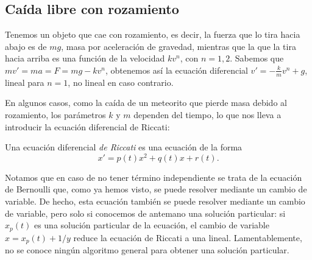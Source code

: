 \documentclass[../ecuaciones_diferenciales.tex]{subfiles}
\begin{document}
\subsection{Caída libre con rozamiento}
Tenemos un objeto que cae con rozamiento, es decir, la fuerza que lo tira
hacia abajo es de \(mg\), masa por aceleración de gravedad, mientras que la
que la tira hacia arriba es una función de la velocidad \(kv^n\), con
\(n = 1,2\). Sabemos que \(mv' = ma = F = mg - kv^n\), obtenemos así la ecuación
diferencial \(v' = -\frac{k}{m} v^n + g\), lineal para \(n = 1\), no lineal
en caso contrario.

En algunos casos, como la caída de un meteorito que pierde masa debido al
rozamiento, los parámetros \(k\) y \(m\) dependen del tiempo, lo que nos lleva a
introducir la ecuación diferencial de Riccati:

\begin{definition}
	Una ecuación diferencial \emph{de Riccati} es una ecuación de la forma
	\[x' = p(t)x^2 + q(t)x + r(t).\]
\end{definition}

Notamos que en caso de no tener término independiente se trata de la ecuación de
Bernoulli que, como ya hemos visto, se puede resolver mediante un cambio de
variable. De hecho, esta ecuación también se puede resolver mediante un cambio
de variable, pero solo si conocemos de antemano una solución particular: si
\(x_p(t)\) es una solución particular de la ecuación, el cambio de variable
\(x = x_p(t) + 1/y\) reduce la ecuación de Riccati a una
lineal. Lamentablemente, no se conoce ningún algoritmo general para obtener una
solución particular.
\end{document}
